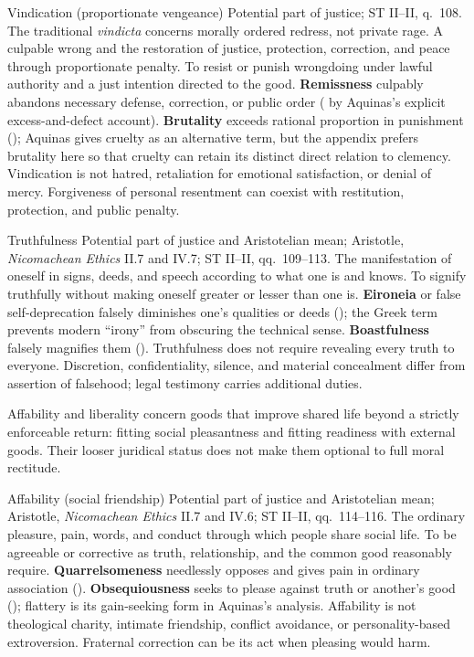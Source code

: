 \virtuedossier
  {Vindication (proportionate vengeance)}
  {Potential part of justice; ST II--II, q.~108. The traditional \emph{vindicta} concerns morally ordered redress, not private rage.}
  {A culpable wrong and the restoration of justice, protection, correction, and peace through proportionate penalty.}
  {To resist or punish wrongdoing under lawful authority and a just intention directed to the good.}
  {\textbf{Remissness} culpably abandons necessary defense, correction, or public order ( by Aquinas's explicit excess-and-defect account).}
  {\textbf{Brutality} exceeds rational proportion in punishment (); Aquinas gives cruelty as an alternative term, but the appendix prefers brutality here so that cruelty can retain its distinct direct relation to clemency.}
  {Vindication is not hatred, retaliation for emotional satisfaction, or denial of mercy. Forgiveness of personal resentment can coexist with restitution, protection, and public penalty.}

\virtuedossier
  {Truthfulness}
  {Potential part of justice and Aristotelian mean; Aristotle, \emph{Nicomachean Ethics} II.7 and IV.7; ST II--II, qq.~109--113.}
  {The manifestation of oneself in signs, deeds, and speech according to what one is and knows.}
  {To signify truthfully without making oneself greater or lesser than one is.}
  {\textbf{Eironeia} or false self-deprecation falsely diminishes one's qualities or deeds (); the Greek term prevents modern “irony” from obscuring the technical sense.}
  {\textbf{Boastfulness} falsely magnifies them ().}
  {Truthfulness does not require revealing every truth to everyone. Discretion, confidentiality, silence, and material concealment differ from assertion of falsehood; legal testimony carries additional duties.}


Affability and liberality concern goods that improve shared life beyond a strictly enforceable return: fitting social pleasantness and fitting readiness with external goods. Their looser juridical status does not make them optional to full moral rectitude.

\virtuedossier
  {Affability (social friendship)}
  {Potential part of justice and Aristotelian mean; Aristotle, \emph{Nicomachean Ethics} II.7 and IV.6; ST II--II, qq.~114--116.}
  {The ordinary pleasure, pain, words, and conduct through which people share social life.}
  {To be agreeable or corrective as truth, relationship, and the common good reasonably require.}
  {\textbf{Quarrelsomeness} needlessly opposes and gives pain in ordinary association ().}
  {\textbf{Obsequiousness} seeks to please against truth or another's good (); flattery is its gain-seeking form in Aquinas's analysis.}
  {Affability is not theological charity, intimate friendship, conflict avoidance, or personality-based extroversion. Fraternal correction can be its act when pleasing would harm.}

